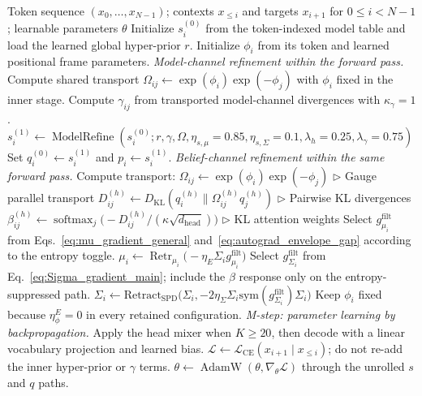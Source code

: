 \documentclass[twoside,11pt]{article}
\newcommand{\softmax}{\operatorname{softmax}}
\newcommand{\KL}{\operatorname{KL}}
\begin{document}
\begin{algorithm}[t]
\caption{Retained two-channel, same-scale GL($K$) training route reconstructed from the archived configurations and corresponding committed code. The inner refinements hold $\phi_i$ fixed, and the next-token target enters only the outer loss. Dirty-worktree provenance prevents byte-level reconstruction of the executed implementation.}
\label{alg:em_loop}
\begin{algorithmic}[1]
\REQUIRE Token sequence $(x_0, \ldots, x_{N-1})$; contexts $x_{\leq i}$ and targets $x_{i+1}$ for $0\leq i<N-1$; learnable parameters $\theta$
\STATE Initialize $s_i^{(0)}$ from the token-indexed model table and load the learned global hyper-prior $r$.
\STATE Initialize $\phi_i$ from its token and learned positional frame parameters.
\STATE
\STATE \textit{Model-channel refinement within the forward pass.}
\STATE Compute shared transport $\Omega_{ij}\leftarrow\exp(\phi_i)\exp(-\phi_j)$ with $\phi_i$ fixed in the inner stage.
\STATE Compute $\gamma_{ij}$ from transported model-channel divergences with $\kappa_\gamma=1$.
\STATE $s_i^{(1)}\leftarrow\operatorname{ModelRefine}(s_i^{(0)};r,\gamma,\Omega,\eta_{s,\mu}=0.85,\eta_{s,\Sigma}=0.1,\lambda_h=0.25,\lambda_\gamma=0.75)$
\STATE Set $q_i^{(0)}\leftarrow s_i^{(1)}$ and $p_i\leftarrow s_i^{(1)}$.
\STATE
\STATE \textit{Belief-channel refinement within the same forward pass.}
\STATE Compute transport: $\Omega_{ij} \leftarrow \exp(\phi_i)\exp(-\phi_j)$ \hfill $\triangleright$ Gauge parallel transport
  \STATE $D_{ij}^{(h)} \leftarrow D_{\KL}(q_i^{(h)} \| \Omega_{ij}^{(h)} q_j^{(h)})$ \hfill $\triangleright$ Pairwise KL divergences
  \STATE $\beta_{ij}^{(h)} \leftarrow \softmax_j \Big(-D_{ij}^{(h)} / (\kappa \sqrt{d_{\text{head}}})\Big)$ \hfill $\triangleright$ KL attention weights
\ENDFOR
\STATE Select $g_{\mu_i}^{\mathrm{filt}}$ from Eqs.~\ref{eq:mu_gradient_general} and~\ref{eq:autograd_envelope_gap} according to the entropy toggle.
\STATE $\mu_i \leftarrow \operatorname{Retr}_{\mu_i}\big(-\eta_E\Sigma_i g_{\mu_i}^{\mathrm{filt}}\big)$
\STATE Select $g_{\Sigma_i}^{\mathrm{filt}}$ from Eq.~\ref{eq:Sigma_gradient_main}; include the $\beta$ response only on the entropy-suppressed path.
\STATE $\Sigma_i \leftarrow \mathrm{Retract}_{\mathrm{SPD}}\big(\Sigma_i,-2\eta_\Sigma\Sigma_i\mathrm{sym}(g_{\Sigma_i}^{\mathrm{filt}})\Sigma_i\big)$
\STATE Keep $\phi_i$ fixed because $\eta_\phi^E=0$ in every retained configuration.
\STATE
\STATE \textit{M-step: parameter learning by backpropagation.}
\STATE Apply the head mixer when $K\geq20$, then decode with a linear vocabulary projection and learned bias.
\STATE $\mathcal{L}\leftarrow\mathcal{L}_{\text{CE}}(x_{i+1}\mid x_{\leq i})$; do not re-add the inner hyper-prior or $\gamma$ terms.
\STATE $\theta \leftarrow \operatorname{AdamW}(\theta,\nabla_\theta\mathcal{L})$ through the unrolled $s$ and $q$ paths.
\end{algorithmic}
\end{algorithm}
\end{document}
